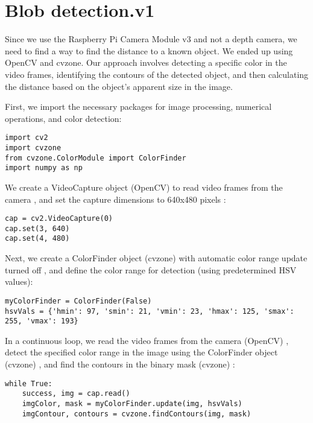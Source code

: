 
\section{Blob detection.v1}

Since we use the Raspberry Pi Camera Module v3 and not a depth camera, we need to find a way to find the distance to a known object. We ended up using OpenCV and cvzone. Our approach involves detecting a specific color in the video frames, identifying the contours of the detected object, and then calculating the distance based on the object's apparent size in the image.

First, we import the necessary packages for image processing, numerical operations, and color detection:

\begin{lstlisting}[language=PythonPlus]
import cv2
import cvzone
from cvzone.ColorModule import ColorFinder
import numpy as np
\end{lstlisting}

We create a VideoCapture object (OpenCV) to read video frames from the camera \cite{OpenCVDoc}, and set the capture dimensions to 640x480 pixels \cite{OpenCVDoc}:

\begin{lstlisting}[language=PythonPlus]
cap = cv2.VideoCapture(0)
cap.set(3, 640)
cap.set(4, 480)
\end{lstlisting}

Next, we create a ColorFinder object (cvzone) with automatic color range update turned off \cite{CVzoneDoc}, and define the color range for detection (using predetermined HSV values):

\begin{lstlisting}[language=PythonPlus]
myColorFinder = ColorFinder(False)
hsvVals = {'hmin': 97, 'smin': 21, 'vmin': 23, 'hmax': 125, 'smax': 255, 'vmax': 193}
\end{lstlisting}

In a continuous loop, we read the video frames from the camera (OpenCV) \cite{OpenCVDoc}, detect the specified color range in the image using the ColorFinder object (cvzone) \cite{CVzoneDoc}, and find the contours in the binary mask (cvzone) \cite{CVzoneDoc}:

\begin{lstlisting}[language=PythonPlus]
while True:
    success, img = cap.read()
    imgColor, mask = myColorFinder.update(img, hsvVals)
    imgContour, contours = cvzone.findContours(img, mask)
\end{lstlisting}

